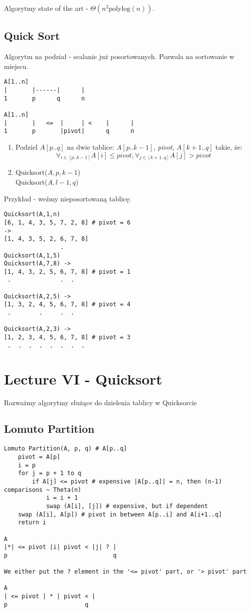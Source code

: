 \documentclass{article}
\numberwithin{equation}{subsection}
\begin{document}
Algorytmy state of the art - $\Theta(n^2 \text{polylog}(n))$.

\subsection{Quick Sort}

Algorytm na podział - scalanie już posortowanych. Pozwala na sortowanie w miejscu.

\begin{verbatim}
A[1..n]
|       |------|      |
1       p      q      n

A[1..n]
|       |   <=  |     | <    |      | 
1       p       |pivot|      q      n
\end{verbatim}

\begin{enumerate}
    \item Podziel $A[p..q]$ na dwie tablice:
    $A[p..k-1]$, \textit{pivot}, $A[k+1..q]$
    takie, że:
    \[
    \forall_{i\in[p..k-1]} A[i] \leq \textit{pivot}, \forall_{j\in[k+1..q]} A[j] > \textit{pivot}
    \]
    \item Quicksort($A,p,k-1$)\\
    Quicksort($A,l-1,q$)
\end{enumerate}
Przykład - weźmy nieposortowaną tablicę:
\begin{verbatim}
Quicksort(A,1,n)
[6, 1, 4, 3, 5, 7, 2, 8] # pivot = 6
->
[1, 4, 3, 5, 2, 6, 7, 8]
                .
Quicksort(A,1,5)
Quicksort(A,7,8) ->
[1, 4, 3, 2, 5, 6, 7, 8] # pivot = 1
 .              .  .

Quicksort(A,2,5) ->
[1, 3, 2, 4, 5, 6, 7, 8] # pivot = 4
 .        .     .  .

Quicksort(A,2,3) ->
[1, 2, 3, 4, 5, 6, 7, 8] # pivot = 3
 .  .  .  .  .  .  .  .
\end{verbatim}
   
\section{Lecture VI - Quicksort}

Rozważmy algorytmy służące do dzielenia tablicy w Quicksorcie

\subsection{Lomuto Partition}

\begin{verbatim}
Lomuto Partition(A, p, q) # A[p..q]
    pivot = A[p]
    i = p
    for j = p + 1 to q
        if A[j] <= pivot # expensive |A[p..q]| = n, then (n-1) comparisons ~ Theta(n)
            i = i + 1
            swap (A[i], [j]) # expensive, but if dependent
    swap (A[i], A[p]) # pivot in between A[p..i] and A[i+1..q]
    return i

A
|*| <= pivot |i| pivot < |j| ? |
p                              q

We either put the ? element in the '<= pivot' part, or '> pivot' part

A
| <= pivot | * | pivot < |
p                      q
\end{verbatim}
\end{document}
